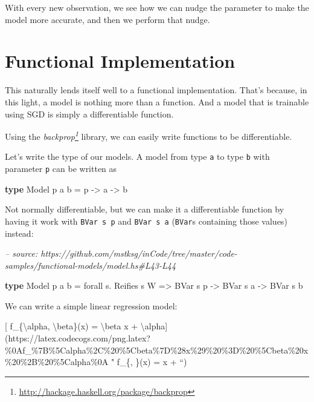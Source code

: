\documentclass[]{article}
\newenvironment{Shaded}{}{}
\newcommand{\CommentTok}[1]{\textcolor[rgb]{0.38,0.63,0.69}{\textit{#1}}}
\newcommand{\DataTypeTok}[1]{\textcolor[rgb]{0.56,0.13,0.00}{#1}}
\newcommand{\FunctionTok}[1]{\textcolor[rgb]{0.02,0.16,0.49}{#1}}
\newcommand{\KeywordTok}[1]{\textcolor[rgb]{0.00,0.44,0.13}{\textbf{#1}}}
\newcommand{\NormalTok}[1]{#1}
\newcommand{\OtherTok}[1]{\textcolor[rgb]{0.00,0.44,0.13}{#1}}
\renewcommand{\href}[2]{#2\footnote{\url{#1}}}
\begin{document}
With every new observation, we see how we can nudge the parameter to make the
model more accurate, and then we perform that nudge.

\hypertarget{functional-implementation}{%
\section{Functional Implementation}\label{functional-implementation}}

This naturally lends itself well to a functional implementation. That's because,
in this light, a model is nothing more than a function. And a model that is
trainable using SGD is simply a differentiable function.

Using the \emph{\href{http://hackage.haskell.org/package/backprop}{backprop}}
library, we can easily write functions to be differentiable.

Let's write the type of our models. A model from type \texttt{a} to type
\texttt{b} with parameter \texttt{p} can be written as

\begin{Shaded}
\begin{Highlighting}[]
\KeywordTok{type} \DataTypeTok{Model}\NormalTok{ p a b }\FunctionTok{=}\NormalTok{ p }\OtherTok{->}\NormalTok{ a }\OtherTok{->}\NormalTok{ b}
\end{Highlighting}
\end{Shaded}

Not normally differentiable, but we can make it a differentiable function by
having it work with \texttt{BVar\ s\ p} and \texttt{BVar\ s\ a} (\texttt{BVar}s
containing those values) instead:

\begin{Shaded}
\begin{Highlighting}[]
\CommentTok{-- source: https://github.com/mstksg/inCode/tree/master/code-samples/functional-models/model.hs#L43-L44}

\KeywordTok{type} \DataTypeTok{Model}\NormalTok{ p a b }\FunctionTok{=}\NormalTok{ forall s}\FunctionTok{.} \DataTypeTok{Reifies}\NormalTok{ s }\DataTypeTok{W}
                 \OtherTok{=>} \DataTypeTok{BVar}\NormalTok{ s p }\OtherTok{->} \DataTypeTok{BVar}\NormalTok{ s a }\OtherTok{->} \DataTypeTok{BVar}\NormalTok{ s b}
\end{Highlighting}
\end{Shaded}

We can write a simple linear regression model:

{[} f\_\{\textbackslash{}alpha, \textbackslash{}beta\}(x) = \textbackslash{}beta
x +
\textbackslash{}alpha{]}(https://latex.codecogs.com/png.latex?\%0Af\_\%7B\%5Calpha\%2C\%20\%5Cbeta\%7D\%28x\%29\%20\%3D\%20\%5Cbeta\%20x\%20\%2B\%20\%5Calpha\%0A
" f\_\{\alpha, \beta\}(x) = \beta x + \alpha ``)
\end{document}
